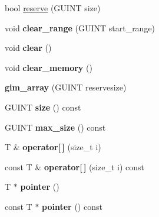 \textbf{ }\par
\begin{DoxyCompactItemize}
\item 
bool \hyperlink{classgim__array_a572f94b5b67d505335150a2dea8a7e3d}{reserve} (G\+U\+I\+NT size)
\item 
\mbox{\label{classgim__array_aaebc1828ad96b461a0351127b1dfb9f3}} 
void {\bfseries clear\+\_\+range} (G\+U\+I\+NT start\+\_\+range)
\item 
\mbox{\label{classgim__array_aae3374d96bac249ba926b6f0825c034e}} 
void {\bfseries clear} ()
\item 
\mbox{\label{classgim__array_afe6bc1b2062f48a25ff1af7bccf46718}} 
void {\bfseries clear\+\_\+memory} ()
\item 
\mbox{\label{classgim__array_a42be09e9a8fa1d7e9f3f8385647d69c2}} 
{\bfseries gim\+\_\+array} (G\+U\+I\+NT reservesize)
\item 
\mbox{\label{classgim__array_a81607b0c307618345418ec2b8b978af0}} 
G\+U\+I\+NT {\bfseries size} () const
\item 
\mbox{\label{classgim__array_a8ab8601b580ef9f951411ac5d25e649b}} 
G\+U\+I\+NT {\bfseries max\+\_\+size} () const
\item 
\mbox{\label{classgim__array_a8c58fd37fa4da11e1dc75a0bb9099363}} 
T \& {\bfseries operator\mbox{[}$\,$\mbox{]}} (size\+\_\+t i)
\item 
\mbox{\label{classgim__array_a6df4e1f1223b8c7cb3cf2dc0039b7a55}} 
const T \& {\bfseries operator\mbox{[}$\,$\mbox{]}} (size\+\_\+t i) const
\item 
\mbox{\label{classgim__array_ad3e924dc4d51d64fd6b4a2ab2ffae793}} 
T $\ast$ {\bfseries pointer} ()
\item 
\mbox{\label{classgim__array_aefbe347f7417a9c5b8ebaa6989cce8bc}} 
const T $\ast$ {\bfseries pointer} () const
\item 
\mbox{\label{classgim__array_a8d24180b31e4b971b0b0d3ee07b0e0f0}} 

\end{DoxyCompactItemize}
